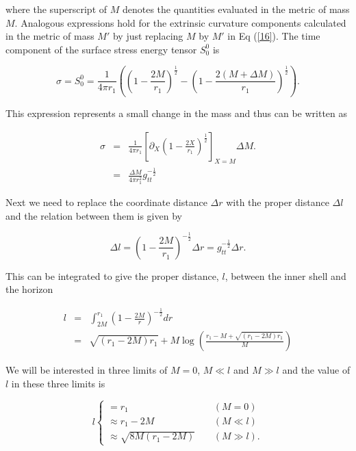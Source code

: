 \documentclass[aps,showpacs,onecolumn,floats,prd,superscriptaddress,nofootinbib]{revtex4-1}
\begin{document}
where the superscript of $M$ denotes the quantities evaluated in the metric of mass $M$. Analogous expressions hold for the extrinsic curvature components calculated in the metric of mass $M'$ by just replacing $M$ by $M'$ in Eq (\ref{16}).
 The time component of the surface stress energy tensor $S^0_0$ is 

\begin{equation}
	\sigma = S^0_0 = \frac{1}{4 \pi r_1} \left( \left( 1 - \frac{2M}{r_1} \right)^\frac{1}{2} - \left( 1 - \frac{2(M+\Delta M)}{r_1} \right)^\frac{1}{2} \right).
\end{equation}

This expression represents a small change in the mass and thus can be written as

\begin{eqnarray}
	\sigma & = & \frac{1}{4 \pi r_1} \left[ \partial_X \left( 1 - \frac{2X}{r_1} \right)^\frac{1}{2} \right]_{X = M} \Delta M. \nonumber	\\
	& = &  \frac{\Delta M}{4 \pi r_1^2} g_{tt}^{-\frac{1}{2}}	\label{sig-Dm}
\end{eqnarray}

Next we need to replace the coordinate distance $\Delta r$ with the proper distance $\Delta l$ and the relation between them is given by

\begin{equation}
	\Delta l = \left( 1 - \frac{2M}{r_1} \right)^{-\frac{1}{2}} \Delta r = g_{tt}^{-\frac{1}{2}} \Delta r.	\label{Dl-Dr}
\end{equation}

This can be integrated to give the proper distance, $l$, between the inner shell and the horizon

\begin{eqnarray}
	l & = & \int^{r_1}_{2M} \left( 1 - \frac{2M}{r} \right)^{-\frac{1}{2}} dr	\nonumber	\\
	& = & \sqrt{(r_1 - 2M)r_1} + M \log \left( \frac{ r_1 - M + \sqrt{(r_1 - 2M)r_1}}{M} \right)	\label{l-r}
\end{eqnarray}

We will be interested in three limits of $M=0$, $M \ll l$ and $M \gg l$ and the value of $l$ in these three limits is

\begin{equation}
l \begin{cases}
= r_1	 &\ \ \ \ \ (M = 0)\\
\approx r_1 - 2M & \ \ \ \ \ (M \ll l)	\\
\approx \sqrt{8M(r_1 - 2M)} & \ \ \ \ \ (M \gg l).
\end{cases}	
\end{equation}
\end{document}
